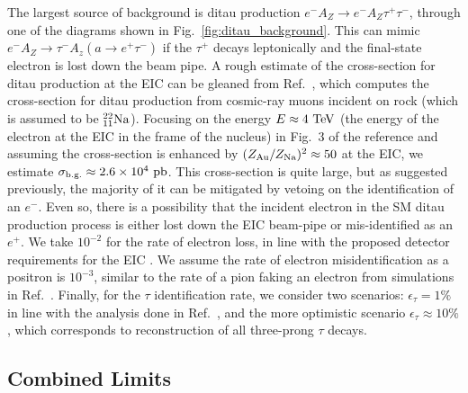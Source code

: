 The largest source of background is ditau production $e^- A_Z \rightarrow e^- A_Z \tau^+\tau^-$, through one of the diagrams shown in Fig.~\ref{fig:ditau_background}. This can mimic $e^- A_Z \rightarrow \tau^- A_z (a\rightarrow e^+ \tau^-)$ if the $\tau^+$ decays leptonically and the final-state electron is lost down the beam pipe. A rough estimate of the cross-section for ditau production at the EIC can be gleaned from Ref.~\cite{Bulmahn:2008fa}, which computes the cross-section for ditau production from cosmic-ray muons incident on rock (which is assumed to be $_{\scriptsize 11}^{\scriptsize 22}{\rm Na}$). Focusing on the energy $E \approx 4~{\rm TeV}$ (the energy of the electron at the EIC in the frame of the nucleus) in  Fig.~3 of the reference and assuming the cross-section is enhanced by $(Z_{\rm Au}/Z_{\rm Na})^2 \approx 50$ at the EIC, we estimate $\sigma_{\rm b.g.} \approx 2.6\times10^{4}~{\rm pb}$. This cross-section is quite large, but as suggested previously, the majority of it can be mitigated by vetoing on the identification of an $e^-$. Even so, there is a possibility that the incident electron in the SM ditau production process is either lost down the EIC beam-pipe or mis-identified as an $e^+$. We take $10^{-2}$ for the rate of electron loss, in line with the proposed detector requirements for the EIC \cite{AbdulKhalek:2021gbh}. We assume the rate of electron misidentification as a positron is $10^{-3}$, similar to the rate of a pion faking an electron from simulations in Ref.~\cite{AbdulKhalek:2021gbh}. Finally, for the $\tau$ identification rate, we consider two scenarios: $\epsilon_\tau = 1\%$ in line with the analysis done in Ref.~\cite{Zhang:2022zuz}, and the more optimistic scenario $\epsilon_\tau \approx 10\%$, which corresponds to reconstruction of all three-prong $\tau$ decays. 


\subsection{Combined Limits}\label{sec:EIC_ALP_limits}

